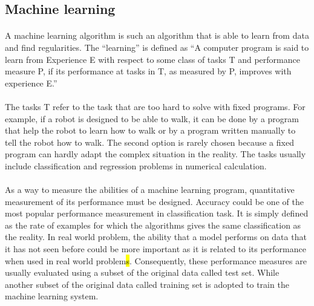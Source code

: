 \subsection{Machine learning}
\label{lr_sec:machine_learning}
\paragraph{}
A machine learning algorithm is such an algorithm that is able to learn from data and find regularities.
The ``learning'' is defined as ``A computer program is said to learn from Experience E with respect to some class of tasks T and performance measure P, if its performance at tasks in T, as measured by P, improves with experience E.'' \citep{Mitchell:1997:ML:541177}
\paragraph{}
The tasks T refer to the task that are too hard to solve with fixed programs.
For example, if a robot is designed to be able to walk, it can be done by a program that help the robot to learn how to walk or by a program written manually to tell the robot how to walk.
The second option is rarely chosen because a fixed program can hardly adapt the complex situation in the reality.
The tasks usually include classification and regression problems in numerical calculation.

\paragraph{}
As a way to measure the abilities of a machine learning program, quantitative measurement of its performance must be designed.
Accuracy could be one of the most popular performance measurement in classification task.
It is simply defined as the rate of examples for which the algorithms gives the same classification as the reality.
In real world problem, the ability that a model performs on data that it has not seen before could be more important as it is related to its performance when used in real world problem\hl{s}.
Consequently, these performance measures are usually evaluated using a subset of the original data called test set.
While another subset of the original data called training set is adopted to train the machine learning system.

